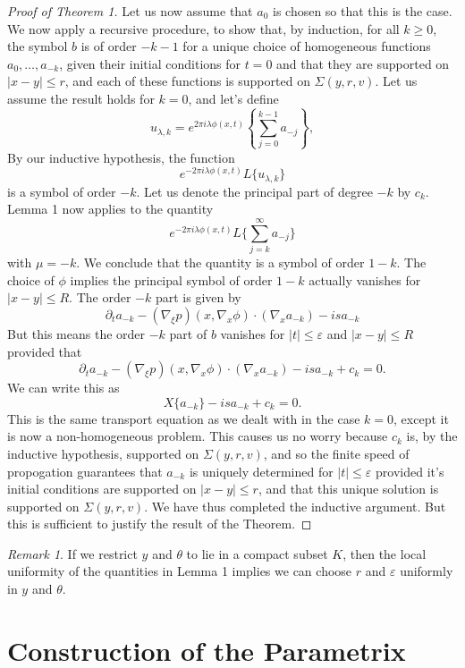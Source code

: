 \documentclass{article}
\theoremstyle{plain}
\theoremstyle{remark}
\newtheorem*{remark}{Remark}
\theoremstyle{definition}
\begin{document}
\begin{proof}[Proof of Theorem 1]
Let us now assume that $a_0$ is chosen so that this is the case. We now apply a recursive procedure, to show that, by induction, for all $k \geq 0$, the symbol $b$ is of order $-k-1$ for a unique choice of homogeneous functions $a_0, \dots, a_{-k}$, given their initial conditions for $t = 0$ and that they are supported on $|x - y| \leq r$, and each of these functions is supported on $\Sigma(y,r,v)$. Let us assume the result holds for $k = 0$, and let's define
%
\[ u_{\lambda,k} = e^{2 \pi i \lambda \phi(x,t)} \left\{ \sum_{j = 0}^{k-1} a_{-j} \right\}, \]
%
By our inductive hypothesis, the function
%
\[ e^{-2 \pi i \lambda \phi(x,t)} L \{ u_{\lambda,k} \} \]
%
is a symbol of order $-k$. Let us denote the principal part of degree $-k$ by $c_k$. Lemma 1 now applies to the quantity
%
\[ e^{-2 \pi i \lambda \phi(x,t)} L \Big\{ \sum_{j = k}^\infty a_{-j} \Big\} \]
%
with $\mu = -k$. We conclude that the quantity is a symbol of order $1 - k$. The choice of $\phi$ implies the principal symbol of order $1-k$ actually vanishes for $|x - y| \leq R$. The order $-k$ part is given by
%
\[ \partial_t a_{-k} - (\nabla_\xi p)(x, \nabla_x \phi) \cdot (\nabla_x a_{-k}) - i s a_{-k} \]
%
But this means the order $-k$ part of $b$ vanishes for $|t| \leq \varepsilon$ and $|x - y| \leq R$ provided that
%
\[ \partial_t a_{-k} - (\nabla_\xi p)(x, \nabla_x \phi) \cdot (\nabla_x a_{-k}) - i s a_{-k} + c_k = 0. \]
%
We can write this as
%
\[ X \{ a_{-k} \} - i s a_{-k} + c_k = 0. \]
%
This is the same transport equation as we dealt with in the case $k = 0$, except it is now a non-homogeneous problem. This causes us no worry because $c_k$ is, by the inductive hypothesis, supported on $\Sigma(y,r,v)$, and so the finite speed of propogation guarantees that $a_{-k}$ is uniquely determined for $|t| \leq \varepsilon$ provided it's initial conditions are supported on $|x - y| \leq r$, and that this unique solution is supported on $\Sigma(y,r,v)$. We have thus completed the inductive argument. But this is sufficient to justify the result of the Theorem. \qedhere

\end{proof}

\begin{remark}
	If we restrict $y$ and $\theta$ to lie in a compact subset $K$, then the local uniformity of the quantities in Lemma 1 implies we can choose $r$ and $\varepsilon$ uniformly in $y$ and $\theta$.
\end{remark}

\section{Construction of the Parametrix}
\end{document}
